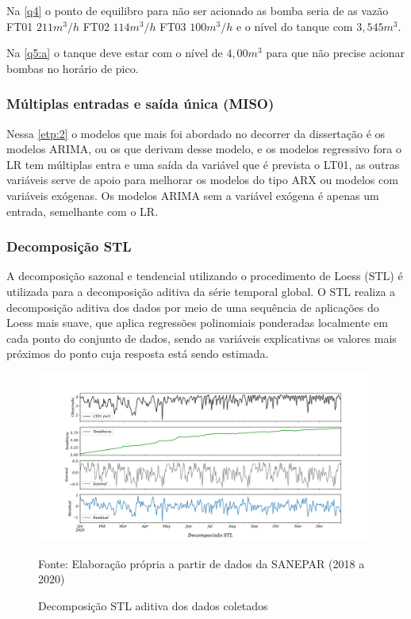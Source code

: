 Na \ref{q4} o ponto de equilibro para não ser acionado as bomba seria de as vazão FT01 $211 m^3/h$  FT02 $114 m^3/h$ FT03 $100m^3/h$ e o nível do tanque com $3,545 m^3$.

Na \ref{q5:a} o tanque deve estar com o nível de $4,00 m^3$ para que não precise acionar bombas no horário de pico. 

\subsubsection{M\'ultiplas entradas e sa\'ida \'unica (MISO)}

Nessa \ref{etp:2} o modelos que mais foi abordado no decorrer da dissertação é os modelos ARIMA, ou os que derivam desse modelo, e os modelos regressivo fora o LR  tem múltiplas entra e uma saída da variável que é prevista o LT01, as outras variáveis serve de apoio para melhorar os modelos do tipo ARX ou modelos com variáveis exógenas. Os modelos ARIMA sem a variável exógena é apenas um entrada, semelhante com o LR.



\subsubsection{Decomposi\c c\~ao STL}

  A decomposição sazonal e tendencial utilizando o procedimento de Loess (STL) é utilizada para a decomposição aditiva da série temporal global. O STL realiza a decomposição aditiva dos dados por meio de uma sequência de aplicações do Loess mais suave, que aplica regressões polinomiais ponderadas localmente em cada ponto do conjunto de dados, sendo as variáveis explicativas os valores mais próximos do ponto cuja resposta está sendo estimada. 
 
 \begin{figure}[H]
 	\centering
 	\caption{Decomposição STL aditiva dos dados coletados}
 	\label{fig:stl-aditiva}
 	\includegraphics[width=1\linewidth]{"Resultados/Figuras/STL aditiva"}
 	
 	Fonte: Elaboração própria a partir de dados da SANEPAR (2018 a 2020)
 \end{figure}
 
